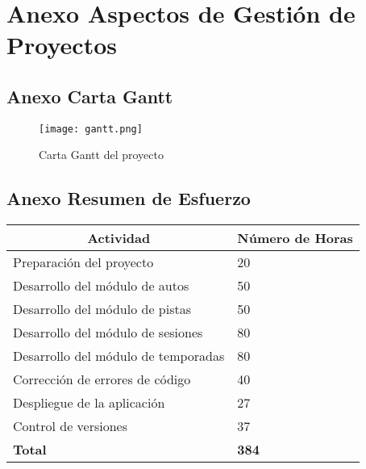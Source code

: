 \section{Anexo Aspectos de Gestión de Proyectos}

\subsection{Anexo Carta Gantt}

\begin{figure}[H]
  \begin{center}
    \texttt{[image: gantt.png]}
  \end{center}
  \caption[Carta Gantt del proyecto]{Carta Gantt del proyecto}
  \label{fig:gantt}
\end{figure}

\subsection{Anexo Resumen de Esfuerzo}
\begin{center}
  \begin{tabular}{ | p{10cm} | p{5cm} |}
    \hline
    \multicolumn{1}{|c|}{\textbf{Actividad}} & \multicolumn{1}{|c|}{\textbf{Número de Horas}} \\
    \hline
    
    {Preparación del proyecto} & {20} \\ \hline
    {Desarrollo del módulo de autos} & {50} \\ \hline
    {Desarrollo del módulo de pistas} & {50} \\ \hline
    {Desarrollo del módulo de sesiones} & {80} \\ \hline
    {Desarrollo del módulo de temporadas} & {80} \\ \hline
    {Corrección de errores de código} & {40} \\ \hline
    {Despliegue de la aplicación} & {27} \\ \hline
    {Control de versiones} & {37} \\ \hline
    
    {\textbf{Total}} & {\textbf{384}} \\

    \hline
  \end{tabular}
  
    \label{table:effort}
\end{center}

\newpage

